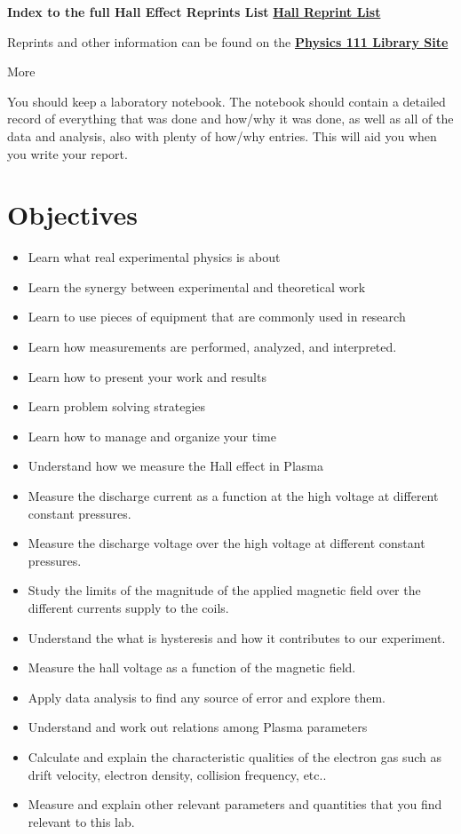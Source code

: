 \documentclass{../lab}
\begin{document}
\textbf{Index to the full Hall Effect Reprints List} \href{http://physics111.lib.berkeley.edu/Physics111/Reprints/HAL/HAL_index.html}{\textbf{Hall Reprint List}}

Reprints and other information can be found on the \href{\LabReprints}{\textbf{Physics 111 Library Site}}

More\textbf{ }

You should keep a laboratory notebook. The notebook should contain a detailed record of everything that was done and how/why it was done, as well as all of the data and analysis, also with plenty of how/why entries. This will aid you when you write your report.

\section{Objectives}

\begin{itemize}
    \item Learn what real experimental physics is about
    \item Learn the synergy between experimental and theoretical work
    \item Learn to use pieces of equipment that are commonly used in research
    \item Learn how measurements are performed, analyzed, and interpreted.
    \item Learn how to present your work and results
    \item Learn problem solving strategies
    \item Learn how to manage and organize your time
    \item Understand how we measure the Hall effect in Plasma
    \item Measure the discharge current as a function at the high voltage at different constant pressures.
    \item Measure the discharge voltage over the high voltage at different constant pressures.
    \item Study the limits of the magnitude of the applied magnetic field over the different currents supply to the coils.
    \item Understand the what is hysteresis  and how it contributes to our experiment.
    \item Measure the hall voltage as a function of the magnetic field.
    \item Apply data analysis to find any source of error and explore them.
    \item Understand and work out relations among Plasma parameters
    \item Calculate and explain the characteristic qualities of the electron gas such as drift velocity, electron density, collision frequency, etc..
    \item Measure and explain other relevant parameters and quantities that you find relevant to this lab.
\end{itemize}
\end{document}
